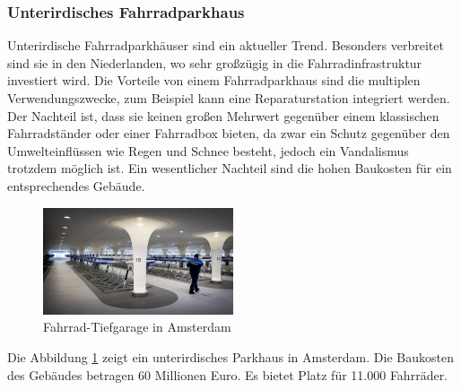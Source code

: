 \subsubsection{Unterirdisches Fahrradparkhaus}
Unterirdische Fahrradparkhäuser sind ein aktueller Trend. Besonders verbreitet sind sie in den Niederlanden, wo sehr großzügig in die Fahrradinfrastruktur investiert wird. Die Vorteile von einem Fahrradparkhaus sind die multiplen Verwendungszwecke, zum Beispiel kann eine Reparaturstation integriert werden.\\
Der Nachteil ist, dass sie keinen großen Mehrwert gegenüber einem klassischen Fahrradständer oder einer Fahrradbox bieten, da zwar ein Schutz gegenüber den Umwelteinflüssen wie Regen und Schnee besteht, jedoch ein Vandalismus trotzdem möglich ist. Ein wesentlicher Nachteil sind die hohen Baukosten für ein entsprechendes Gebäude.\\

\begin{figure}[H]
    \centering
    \includegraphics[width=0.5\textwidth]{images/unterirdischesfahrradparkhaus.jpg}
    \caption{Fahrrad-Tiefgarage in Amsterdam }
    \label{fig:fahradtiefgarage}
\end{figure}

Die Abbildung \ref*{fig:fahradtiefgarage} zeigt ein unterirdisches Parkhaus in Amsterdam. Die Baukosten des Gebäudes betragen 60 Millionen Euro. Es bietet Platz für 11.000 Fahrräder.
